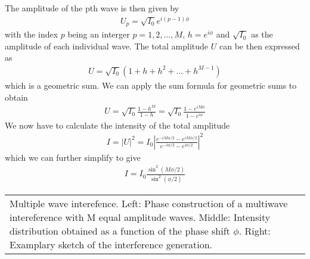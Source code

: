 \documentclass[letterpaper,10pt,english]{sphinxmanual}
\begin{document}
The amplitude of the p\sphinxhyphen{}th wave is then given by
\begin{equation*}
\begin{split}U_p=\sqrt{I_0}e^{i(p-1)\phi}\end{split}
\end{equation*}
with the index \(p\) being an interger \(p=1,2,\ldots,M\), \(h=e^{i\phi}\) and \(\sqrt{I_0}\) as the amplitude of each individual wave. The total amplitude \(U\) can be then expressed as
\begin{equation*}
\begin{split}U=\sqrt{I_0}\left (1+h+h^2+\ldots +h^{M-1}\right)\end{split}
\end{equation*}
which is a geometric sum. We can apply the sum formula for geometric sums to obtain
\begin{equation*}
\begin{split}U=\sqrt{I_0}\frac{1-h^M}{1-h}=\sqrt{I_0}\frac{1-e^{iM\phi}}{1-e^{i\phi}}\end{split}
\end{equation*}
We now have to calculate the intensity of the total amplitude
\begin{equation*}
\begin{split}I=|U|^2=I_{0}\left | \frac{e^{-iM\phi/2}-e^{iM\phi/2}}{e^{-i\phi/2}-e^{i\phi/2}}\right |^2\end{split}
\end{equation*}
which we can further simplify to give
\begin{equation*}
\begin{split}I=I_{0}\frac{\sin^2(M\phi/2)}{\sin^2(\phi/2)}\end{split}
\end{equation*}

\begin{savenotes}\sphinxattablestart
\centering
\begin{tabulary}{\linewidth}[t]{|T|}
\hline
\sphinxstyletheadfamily 
{}
\\
\hline
{} Multiple wave interefence. Left: Phase construction of a multiwave intereference with M equal amplitude waves. Middle: Intensity distribution obtained as a function of the phase shift \(\phi\). Right: Examplary sketch of the interference generation.
\\
\hline
\end{tabulary}
\par
\sphinxattableend\end{savenotes}
\end{document}
